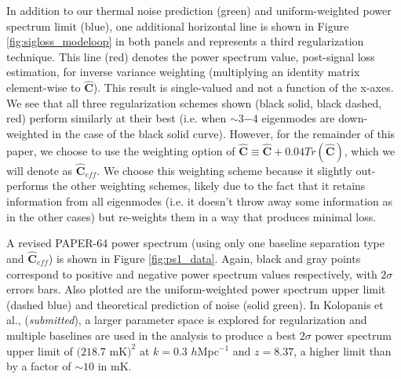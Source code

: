 \documentclass[preprint2,numberedappendix,tighten]{aastex6}  %
\begin{document}
In addition to our thermal noise prediction (green) and uniform-weighted power spectrum limit (blue), one additional horizontal line is shown in Figure \ref{fig:sigloss_modeloop} 
in both panels and represents a third regularization technique. This line (red) denotes the power spectrum value, post-signal loss estimation, for inverse variance weighting (multiplying an identity 
matrix element-wise to $\widehat{\textbf{C}}$). This result is single-valued and not a function of the x-axes. We see that all three regularization schemes shown (black solid, black dashed, red) perform similarly at 
their best (i.e. when $\sim3$$-4$ eigenmodes are down-weighted in the case of the black solid curve). However, for the remainder of this paper, we choose to use the weighting option of $\widehat{\textbf{C}} \equiv \widehat{\textbf{C}} + 0.04Tr(\widehat{\textbf{C}})$, which we will denote as $\widehat{\textbf{C}}_{eff}$. We choose this weighting scheme because it slightly out-performs the other weighting schemes, likely due to the fact that it retains information from all eigenmodes (i.e. it doesn't throw away some information as in the other cases) but re-weights them in a way that produces minimal loss.

A revised PAPER-64 power spectrum (using only one baseline separation type and $\widehat{\textbf{C}}_{eff}$) is shown in Figure 
\ref{fig:ps1_data}. Again, black and gray points correspond to positive and negative power spectrum values respectively, with 
$2\sigma$ errors bars. Also plotted are the uniform-weighted power spectrum upper limit (dashed blue) and theoretical prediction of 
noise (solid green). In Kolopanis et al., (\textit{submitted}), a larger parameter space is explored for regularization and multiple baselines are used in the analysis to produce a best $2\sigma$ power spectrum upper limit of $(218.7$ mK$)^{2}$ at $k=0.3$ $h$Mpc$^{-1}$ and $z=8.37$, 
a higher limit than  by a factor of $\sim$$10$ in mK.
\end{document}

